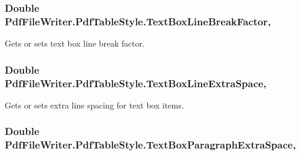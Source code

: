 \subsubsection[{\texorpdfstring{Text\+Box\+Line\+Break\+Factor}{TextBoxLineBreakFactor}}]{\setlength{\rightskip}{0pt plus 5cm}Double Pdf\+File\+Writer.\+Pdf\+Table\+Style.\+Text\+Box\+Line\+Break\+Factor\hspace{0.3cm}{\ttfamily [get]}, {\ttfamily [set]}}\hypertarget{class_pdf_file_writer_1_1_pdf_table_style_a51f805784b73bd5de8012d6366d7c56b}{}\label{class_pdf_file_writer_1_1_pdf_table_style_a51f805784b73bd5de8012d6366d7c56b}


Gets or sets text box line break factor. 

\subsubsection[{\texorpdfstring{Text\+Box\+Line\+Extra\+Space}{TextBoxLineExtraSpace}}]{\setlength{\rightskip}{0pt plus 5cm}Double Pdf\+File\+Writer.\+Pdf\+Table\+Style.\+Text\+Box\+Line\+Extra\+Space\hspace{0.3cm}{\ttfamily [get]}, {\ttfamily [set]}}\hypertarget{class_pdf_file_writer_1_1_pdf_table_style_a320b86209a5066dabf4e66c6448e00ee}{}\label{class_pdf_file_writer_1_1_pdf_table_style_a320b86209a5066dabf4e66c6448e00ee}


Gets or sets extra line spacing for text box items. 

\subsubsection[{\texorpdfstring{Text\+Box\+Paragraph\+Extra\+Space}{TextBoxParagraphExtraSpace}}]{\setlength{\rightskip}{0pt plus 5cm}Double Pdf\+File\+Writer.\+Pdf\+Table\+Style.\+Text\+Box\+Paragraph\+Extra\+Space\hspace{0.3cm}{\ttfamily [get]}, {\ttfamily [set]}}\hypertarget{class_pdf_file_writer_1_1_pdf_table_style_a4ea60f87203491fc37c274bd3514432e}{}\label{class_pdf_file_writer_1_1_pdf_table_style_a4ea60f87203491fc37c274bd3514432e}


